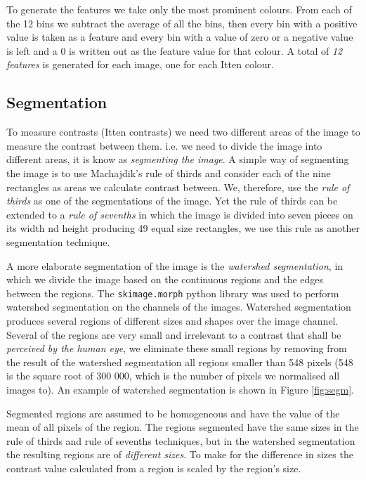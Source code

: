 \documentclass[11pt,a4paper,twoside,openright]{report}
\begin{document}
To generate the features we take only the most prominent colours.  From each of
the 12 bins we subtract the average of all the bins, then every bin with a
positive value is taken as a feature and every bin with a value of zero or a
negative value is left and a 0 is written out as the feature value for that
colour.  A total of \emph{12 features} is generated for each image, one for
each Itten colour.

\subsection{Segmentation}

To measure contrasts (Itten contrasts) we need two different areas of the image
to measure the contrast between them.  i.e. we need to divide the image into
different areas, it is know as \emph{segmenting the image}.  A simple way of
segmenting the image is to use Machajdik's rule of thirds \cite{mach10clas} and
consider each of the nine rectangles as areas we calculate contrast between.
We, therefore, use the \emph{rule of thirds} as one of the segmentations of the
image.  Yet the rule of thirds can be extended to a \emph{rule of sevenths} in
which the image is divided into seven pieces on its width nd height producing
49 equal size rectangles, we use this rule as another segmentation technique.

A more elaborate segmentation of the image is the \emph{watershed
segmentation}, in which we divide the image based on the continuous regions and
the edges between the regions.  The \texttt{skimage.morph} python library was
used to perform watershed segmentation on the channels of the images.
Watershed segmentation produces several regions of different sizes and shapes
over the image channel.  Several of the regions are very small and irrelevant
to a contrast that shall be \emph{perceived by the human eye}, we eliminate
these small regions by removing from the result of the watershed segmentation
all regions smaller than 548 pixels (548 is the square root of 300 000, which
is the number of pixels we normalised all images to).  An example of watershed
segmentation is shown in Figure \ref{fig:segm}.

Segmented regions are assumed to be homogeneous and have the value of the mean
of all pixels of the region.  The regions segmented have the same sizes in the
rule of thirds and rule of sevenths techniques, but in the watershed
segmentation the resulting regions are of \emph{different sizes}.  To make for
the difference in sizes the contrast value calculated from a region is scaled
by the region's size.
\end{document}
